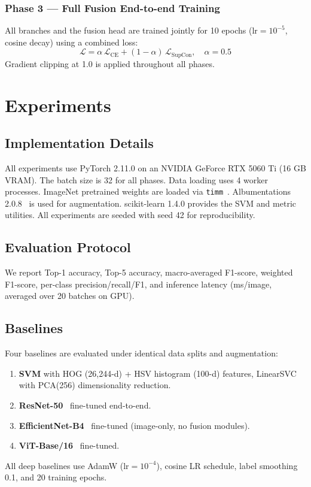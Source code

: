 \documentclass[conference]{IEEEtran}
\begin{document}
\subsubsection{Phase 3 — Full Fusion End-to-end Training}
All branches and the fusion head are trained jointly for 10 epochs
($\text{lr}=10^{-5}$, cosine decay) using a combined loss:
\begin{equation}
    \mathcal{L} = \alpha\,\mathcal{L}_{\text{CE}} + (1-\alpha)\,\mathcal{L}_{\text{SupCon}},
    \quad \alpha = 0.5
    \label{eq:combined}
\end{equation}
Gradient clipping at 1.0 is applied throughout all phases.


\section{Experiments}
\label{sec:experiments}

\subsection{Implementation Details}
All experiments use PyTorch 2.11.0 on an NVIDIA GeForce RTX 5060 Ti (16 GB VRAM).
The batch size is 32 for all phases. Data loading uses 4 worker processes. ImageNet
pretrained weights are loaded via \texttt{timm}~\cite{rw2019timm}. Albumentations
2.0.8~\cite{info11020125} is used for augmentation. scikit-learn 1.4.0 provides
the SVM and metric utilities. All experiments are seeded with seed 42 for
reproducibility.

\subsection{Evaluation Protocol}
We report Top-1 accuracy, Top-5 accuracy, macro-averaged F1-score, weighted
F1-score, per-class precision/recall/F1, and inference latency (ms/image,
averaged over 20 batches on GPU).

\subsection{Baselines}
Four baselines are evaluated under identical data splits and augmentation:
\begin{enumerate}
    \item \textbf{SVM} with HOG (26,244-d) + HSV histogram (100-d) features,
          LinearSVC with PCA(256) dimensionality reduction.
    \item \textbf{ResNet-50}~\cite{he2016deep} fine-tuned end-to-end.
    \item \textbf{EfficientNet-B4}~\cite{tan2019efficientnet} fine-tuned
          (image-only, no fusion modules).
    \item \textbf{ViT-Base/16}~\cite{dosovitskiy2020image} fine-tuned.
\end{enumerate}
All deep baselines use AdamW ($\text{lr}=10^{-4}$), cosine LR schedule,
label smoothing 0.1, and 20 training epochs.
\end{document}
